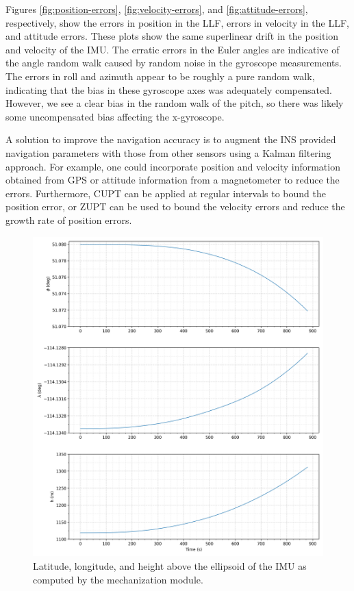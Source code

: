 \documentclass[11pt, oneside]{article}   	%
\begin{document}
Figures \ref{fig:position-errors}, \ref{fig:velocity-errors}, and \ref{fig:attitude-errors}, respectively, show the errors in position in the LLF, errors in velocity in the LLF, and attitude errors.  These plots show the same superlinear drift in the position and velocity of the IMU.  The erratic errors in the Euler angles are indicative of the angle random walk caused by random noise in the gyroscope measurements.  The errors in roll and azimuth appear to be roughly a pure random walk, indicating that the bias in these gyroscope axes was adequately compensated.  However, we see a clear bias in the random walk of the pitch, so there was likely some uncompensated bias affecting the x-gyroscope.

A solution to improve the navigation accuracy is to augment the INS provided navigation parameters with those from other sensors using a Kalman filtering approach.  For example, one could incorporate position and velocity information obtained from GPS or attitude information from a magnetometer to reduce the errors.  Furthermore, CUPT can be applied at regular intervals to bound the position error, or ZUPT can be used to bound the velocity errors and reduce the growth rate of position errors.

\begin{figure}[!htbp]
\centerline{\includegraphics[width=16cm]{img/position.png}}
\caption{\label{fig:position} Latitude, longitude, and height above the ellipsoid of the IMU as computed by the mechanization module.}
\end{figure}
\end{document}
